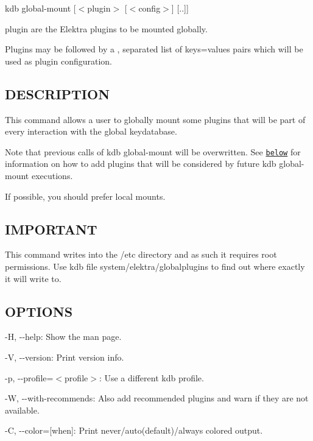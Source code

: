 {\ttfamily kdb global-\/mount \mbox{[}$<$plugin$>$ \mbox{[}$<$config$>$\mbox{]} \mbox{[}..\mbox{]}\mbox{]}}


\begin{DoxyItemize}
\item {\ttfamily plugin} are the Elektra plugins to be mounted globally.
\item Plugins may be followed by a {\ttfamily ,} separated list of {\ttfamily keys=values} pairs which will be used as plugin configuration.
\end{DoxyItemize}

\subsection*{D\+E\+S\+C\+R\+I\+P\+T\+I\+O\+N}

This command allows a user to globally mount some plugins that will be part of every interaction with the global keydatabase.

Note that previous calls of {\ttfamily kdb global-\/mount} will be overwritten. See \href{#KDB}{\tt below} for information on how to add plugins that will be considered by future {\ttfamily kdb global-\/mount} executions.

If possible, you should prefer local mounts.

\subsection*{I\+M\+P\+O\+R\+T\+A\+N\+T}

This command writes into the {\ttfamily /etc} directory and as such it requires root permissions. Use {\ttfamily kdb file system/elektra/globalplugins} to find out where exactly it will write to.

\subsection*{O\+P\+T\+I\+O\+N\+S}


\begin{DoxyItemize}
\item {\ttfamily -\/\+H}, {\ttfamily -\/-\/help}\+: Show the man page.
\item {\ttfamily -\/\+V}, {\ttfamily -\/-\/version}\+: Print version info.
\item {\ttfamily -\/p}, {\ttfamily -\/-\/profile}=$<$profile$>$\+: Use a different kdb profile.
\item {\ttfamily -\/\+W}, {\ttfamily -\/-\/with-\/recommends}\+: Also add recommended plugins and warn if they are not available.
\item {\ttfamily -\/\+C}, {\ttfamily -\/-\/color}=\mbox{[}when\mbox{]}\+: Print never/auto(default)/always colored output.
\end{DoxyItemize}

